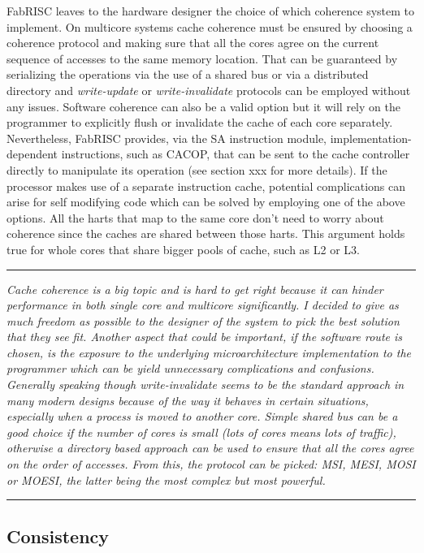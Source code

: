         FabRISC leaves to the hardware designer the choice of which coherence system to implement. On multicore systems cache coherence must be ensured by choosing a coherence protocol and making sure that all the cores agree on the current sequence of accesses to the same memory location. That can be guaranteed by serializing the operations via the use of a shared bus or via a distributed directory and \textit{write-update} or \textit{write-invalidate} protocols can be employed without any issues. Software coherence can also be a valid option but it will rely on the programmer to explicitly flush or invalidate the cache of each core separately. Nevertheless, FabRISC provides, via the SA instruction module, implementation-dependent instructions, such as CACOP, that can be sent to the cache controller directly to manipulate its operation (see section xxx for more details). If the processor makes use of a separate instruction cache, potential complications can arise for self modifying code which can be solved by employing one of the above options. All the harts that map to the same core don't need to worry about coherence since the caches are shared between those harts. This argument holds true for whole cores that share bigger pools of cache, such as L2 or L3.

    \par\noindent\rule{\textwidth}{0.4pt}
    \textit{Cache coherence is a big topic and is hard to get right because it can hinder performance in both single core and multicore significantly. I decided to give as much freedom as possible to the designer of the system to pick the best solution that they see fit. Another aspect that could be important, if the software route is chosen, is the exposure to the underlying microarchitecture implementation to the programmer which can be yield unnecessary complications and confusions. Generally speaking though write-invalidate seems to be the standard approach in many modern designs because of the way it behaves in certain situations, especially when a process is moved to another core. Simple shared bus can be a good choice if the number of cores is small (lots of cores means lots of traffic), otherwise a directory based approach can be used to ensure that all the cores agree on the order of accesses. From this, the protocol can be picked: MSI, MESI, MOSI or MOESI, the latter being the most complex but most powerful.}
    \par\noindent\rule{\textwidth}{0.4pt}

    \subsection{Consistency}

